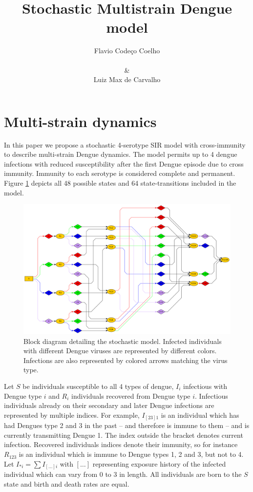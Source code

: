\documentclass[12pt]{article}
\title{
Stochastic Multistrain Dengue model
}
\author{
Flavio Code\c{c}o Coelho \\
\\
\& \\
Luiz Max de Carvalho \\
}
\date{}
\begin{document}
                                  


%
\maketitle


\section*{Multi-strain dynamics}

In this paper we propose a stochastic 4-serotype SIR model with 
cross-immunity to describe multi-strain Dengue dynamics. 
The model permits up to 4 dengue infections 
with reduced susceptibility after the first Dengue episode due to cross 
immunity. 
Immunity to each serotype is considered complete and permanent. 
Figure \ref{fig:sde_blocks} depicts all 48 possible states and 64 
state-transitions included in the model.

          \begin{figure}
 \centering
 \includegraphics[width=16cm]{Dengue4.png}

 \caption{Block diagram detailing the stochastic model. Infected individuals 
with different Dengue viruses are represented by different colors. Infections 
are also represented by colored arrows matching the virus type.}
 \label{fig:sde_blocks}
\end{figure}


Let $S$ be individuals susceptible to all 4 types of dengue, $I_i$ infectious 
with Dengue type $i$ and $R_i$ individuals recovered from Dengue type $i$. 
Infectious individuals already on their secondary and later Dengue infections 
are represented by multiple indices. For example, $I_{[23]1}$ is an individual 
which has had Dengues type 2 and 3 in the past -- and therefore is immune to 
them -- and is currently transmitting Dengue 1. 
The index outside the bracket 
denotes current infection. Recovered individuals indices denote their immunity, 
so for instance $R_{123}$ is an individual which is immune to Dengue types 1, 2 
and 3, but not to 4. Let $I_{*i} = \sum I_{[\ldots]i}$ with $[\ldots]$ 
representing exposure history of the infected individual which can vary from 0 
to 3 in length. 
All individuals are born to the $S$ state and birth and death 
rates are equal.
\end{document}
